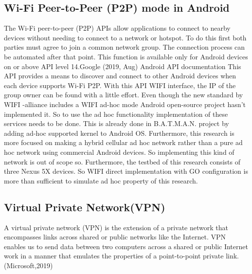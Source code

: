 \subsection{Wi-Fi Peer-to-Peer (P2P) mode in Android }
\vspace{12pt}
The Wi-Fi peer-to-peer (P2P) APIs allow applications to connect to nearby devices without needing to connect to a network or hotspot. To do this first both parties must agree to join a common network group. The connection process can be automated after that point. This function is available only for Android  devices on or above API level 14.Google (2019, Aug) Android  API documentation\cite{WiFiDirect_android}
\vspace{12pt}
This API provides a means to discover and connect to other Android devices when each device supports Wi-Fi P2P. With this API  WIFI  interface, the IP of the group owner can be found with a little effort.
\vspace{12pt}
Even though the new standard by  WIFI  -alliance includes a  WIFI  ad-hoc mode Android open-source project hasn’t implemented it. So to use the ad hoc functionality implementation of these services needs to be done. This is already done in B.A.T.M.A.N. project\cite{BATMAN} by adding ad-hoc supported kernel to Android  OS. Furthermore, this research is more focused on making a hybrid cellular ad hoc network rather than a pure ad hoc network using commercial Android devices. So implementing this kind of network is out of scope so. Furthermore, the testbed of this research consists of three Nexus 5X devices. So  WIFI  direct implementation with GO configuration is more than sufficient to simulate ad hoc property of this research.
\vspace{12pt}
\subsection{Virtual Private Network(VPN)}
\vspace{12pt}
A virtual private network (VPN) is the extension of a private network that encompasses links across shared or public networks like the Internet. VPN enables us to send data between two computers across a shared or public Internet work in a manner that emulates the properties of a point-to-point private link. (Microsoft,2019)\cite{vpn}

\vspace{12pt}
